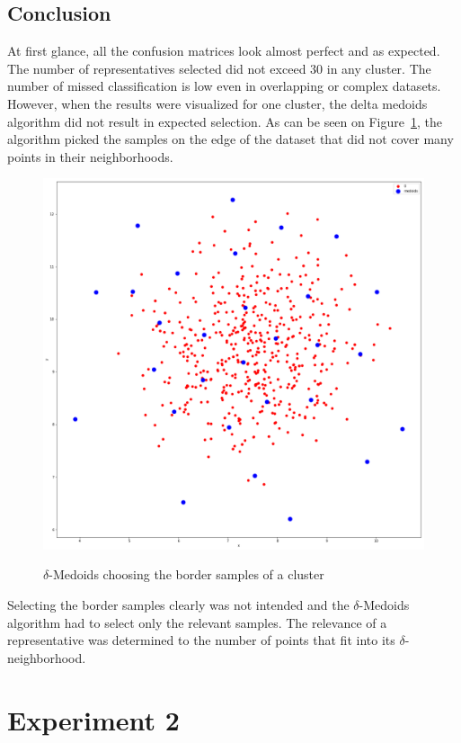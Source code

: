 \documentclass[thesis=B,english]{FITthesis}[2012/10/20]
\begin{document}
\subsection{Conclusion}
At first glance, all the confusion matrices look almost perfect and as expected.
The number of representatives selected did not exceed 30 in any cluster.
The number of missed classification is low even in overlapping or complex datasets.
However, when the results were visualized for one cluster, the delta medoids algorithm did not result in expected selection.
As can be seen on Figure~\ref{img:blobs_border_select}, the algorithm picked the samples on the edge of the dataset that did not cover many points in their neighborhoods.
\begin{figure}
   \includegraphics[width=\linewidth]{img/delta_medoids_select.png}
  \label{img:blobs_border_select}
  \caption{$\delta$-Medoids choosing the border samples of a cluster}
\end{figure}
Selecting the border samples clearly was not intended and the $\delta$-Medoids algorithm had to select only the relevant samples.
The relevance of a representative was determined to the number of points that fit into its $\delta$-neighborhood. 

\section{Experiment 2}\label{sec:exp2}
\end{document}
